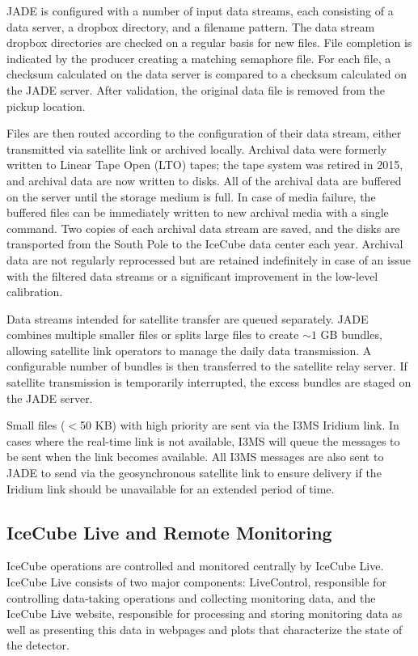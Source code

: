 JADE is configured with a number of input data streams, 
each consisting of a data server, a dropbox directory, and a filename pattern.  The
data stream dropbox directories are checked on a regular basis for new
files.  File completion is indicated by the producer creating a matching
semaphore file.  For each file, a
checksum calculated on the data server is compared to a checksum calculated
on the JADE server.  After validation, the original data file is removed
from the pickup location. 

Files are then routed according to the configuration of their
data stream, either transmitted via satellite link or 
archived locally.  Archival data
were formerly written to Linear Tape Open (LTO) tapes; the tape system was
retired in 2015, and archival data are now written to disks.
All of the archival data are buffered on the server until the storage medium
is full. In case of media failure, the buffered files can be 
immediately written to new archival media with a single command.  
Two copies of each archival data stream are saved, and the disks are
transported from the South Pole to the IceCube data center each
year.  Archival data are not regularly reprocessed but are retained
indefinitely in case of an issue with the filtered data streams or a
significant improvement in the low-level calibration.

Data streams intended for satellite transfer are queued separately.  
JADE combines multiple smaller files or splits large files to create $\sim1$
GB bundles, allowing satellite link operators to manage the daily data
transmission.  A configurable number of bundles is then transferred to the
satellite relay server.  If satellite transmission is temporarily
interrupted, the excess bundles are staged on the JADE server. 

Small files ($<$50 KB) with high priority are sent via
the I3MS Iridium link.  In cases where the real-time link is not available, I3MS
will queue the messages to be sent when the link becomes available. All
I3MS messages are also sent to JADE to send via the geosynchronous satellite link to
ensure delivery if the Iridium link should be unavailable for an extended
period of time.

\subsection{\label{sec:online:icecubelive}IceCube Live and Remote Monitoring}

IceCube operations are controlled and monitored centrally by IceCube Live.
IceCube Live consists of two major components: LiveControl,
responsible for controlling data-taking operations and collecting
monitoring data, and the IceCube Live website, responsible for processing
and storing monitoring data as well as presenting this data in webpages and
plots that characterize the state of the detector.

